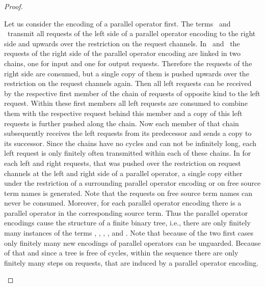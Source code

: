 \documentclass[]{llncs}
\begin{document}
\begin{proof}
\begin{description}
			Let us consider the encoding of a parallel operator first. The terms \processLeftOutputRequests \ and \processLeftInputRequests \ transmit all requests of the left side of a parallel operator encoding to the right side and upwards over the restriction on the request channels. In \processRightOutputRequests \ and \processRightInputRequests \ the requests of the right side of the parallel operator encoding are linked in two chains, one for input and one for output requests. Therefore the requests of the right side are consumed, but a single copy of them is pushed upwards over the restriction on the request channels again. Then all left requests can be received by the respective first member of the chain of requests of opposite kind to the left request. Within these first members all left requests are consumed to combine them with the respective request behind this member and a copy of this left requests is further pushed along the chain. Now each member of that chain subsequently receives the left requests from its predecessor and sends a copy to its successor. Since the chains have no cycles and can not be infinitely long, each left request is only finitely often transmitted within each of these chains. In \pushRequests for each left and right requests, that was pushed over the restriction on request channels at the left and right side of a parallel operator, a single copy either under the restriction of a surrounding parallel operator encoding or on free source term names is generated. Note that the requests on free source term names can never be consumed. Moreover, for each parallel operator encoding there is a parallel operator in the corresponding source term. Thus the parallel operator encodings cause the structure of a finite binary tree, i.e., there are only finitely many instances of the terms \processLeftOutputRequests, \processLeftInputRequests, \processRightOutputRequests, \processRightInputRequests, and \pushRequests. Note that because of the two first cases only finitely many new encodings of parallel operators can be unguarded. Because of that and since a tree is free of cycles, within the sequence  there are only finitely many steps on requests, that are induced by a parallel operator encoding.
			

\end{description}
\end{proof}
\end{document}
